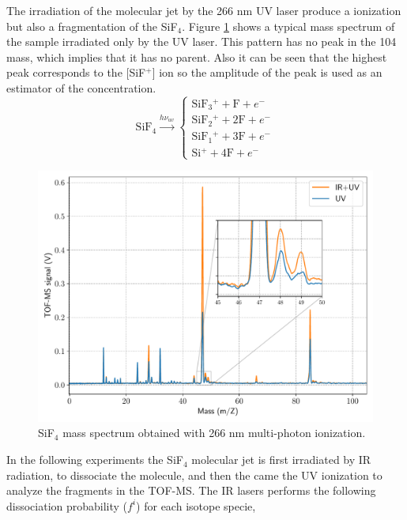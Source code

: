\documentclass[global,twocolumn]{svjour}
\begin{document}
The irradiation of the molecular jet by the 266 nm UV laser produce a ionization but also a fragmentation of the SiF$_{4}$. Figure \ref{fig:spec_uv} shows a typical mass spectrum of the sample irradiated only by the UV laser. This pattern has no peak in the 104 mass, which implies that it has no parent. Also it can be seen that the highest peak corresponds to the [SiF$^{+}$] ion so the amplitude of the peak is used as an estimator of the concentration.
\begin{equation}
\text{SiF$_{4}$} \xrightarrow{h \nu_{uv}}
\begin{cases}
\text{SiF$_{3}$$^{+}$} + \text{F} + e^{-} \\
\text{SiF$_{2}$$^{+}$} + \text{2F} + e^{-} \\
\text{SiF$_{1}$$^{+}$} + \text{3F} + e^{-} \\
\text{Si$^{+}$} + \text{4F} + e^{-}
\end{cases}
\end{equation}

\begin{figure}[h]
	\includegraphics[width =1\linewidth]{figures/sp_uv_ir.pdf}
	\caption{\label{fig:spec_uv} SiF$_{4}$ mass spectrum obtained with 266 nm multi-photon ionization.}
\end{figure}

In the following experiments the SiF$_{4}$ molecular jet is first irradiated by IR radiation, to dissociate the molecule, and then the came the UV ionization to analyze the fragments in the TOF-MS. The IR lasers performs the following dissociation probability ($f^{i}$) for each isotope specie,
\end{document}
